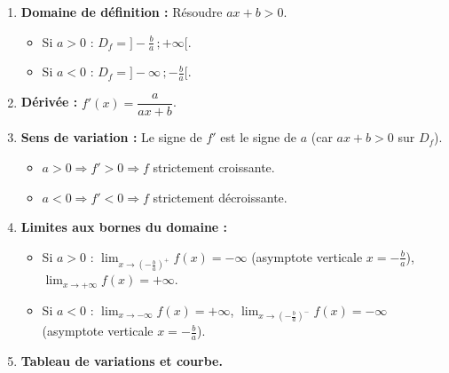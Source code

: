\documentclass[11pt]{article}
\begin{document}
\begin{methode}[Étude complète de $f(x) = \ln(ax+b)$ avec $a \neq 0$]
\begin{enumerate}
    \item \textbf{Domaine de définition :} Résoudre $ax+b > 0$.
    \begin{itemize}
        \item Si $a > 0$ : $D_f = ]-\frac{b}{a}\,; +\infty[$.
        \item Si $a < 0$ : $D_f = ]-\infty\,; -\frac{b}{a}[$.
    \end{itemize}
    \item \textbf{Dérivée :} $f'(x) = \dfrac{a}{ax+b}$.
    \item \textbf{Sens de variation :} Le signe de $f'$ est le signe de $a$ (car $ax+b > 0$ sur $D_f$).
    \begin{itemize}
        \item $a > 0 \Rightarrow f' > 0 \Rightarrow f$ strictement croissante.
        \item $a < 0 \Rightarrow f' < 0 \Rightarrow f$ strictement décroissante.
    \end{itemize}
    \item \textbf{Limites aux bornes du domaine :}
    \begin{itemize}
        \item Si $a > 0$ : $\lim_{x \to (-\frac{b}{a})^+} f(x) = -\infty$ (asymptote verticale $x = -\frac{b}{a}$), $\lim_{x \to +\infty} f(x) = +\infty$.
        \item Si $a < 0$ : $\lim_{x \to -\infty} f(x) = +\infty$, $\lim_{x \to (-\frac{b}{a})^-} f(x) = -\infty$ (asymptote verticale $x = -\frac{b}{a}$).
    \end{itemize}
    \item \textbf{Tableau de variations et courbe.}
\end{enumerate}
\end{methode}
\end{document}
